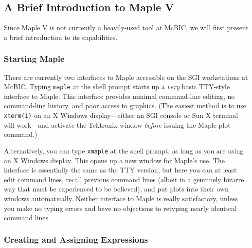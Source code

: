 \documentclass[11pt]{article}
\def\code#1{{\tt #1}}
\begin{document}
\subsection{A Brief Introduction to Maple V}

Since Maple V is not currently a heavily-used tool at McBIC, we will
first present a brief introduction to its capabilities.

\subsubsection{Starting Maple}

There are currently two interfaces to Maple accessible on the SGI
workstations at McBIC.  Typing \code{maple} at the shell prompt starts
up a {\em very} basic TTY-style interface to Maple.  This interface
provides minimal command-line editing, no command-line history, and
poor access to graphics.  (The easiest method is to use
\code{xterm(1)} on an X Windows display---either an SGI console or Sun
X terminal will work---and activate the Tektronix window {\em before}
issuing the Maple plot command.)

Alternatively, you can type \code{xmaple} at the shell prompt, as long
as you are using an X Windows display.  This opens up a new window for
Maple's use.  The interface is essentially the same as the TTY version,
but here you can at least edit command lines, recall previous command
lines (albeit in a genuinely bizarre way that must be experienced to be
believed), and put plots into their own windows automatically.  Neither
interface to Maple is really satisfactory, unless you make no typing
errors and have no objections to retyping nearly identical command
lines.

\subsubsection{Creating and Assigning Expressions}
\end{document}
